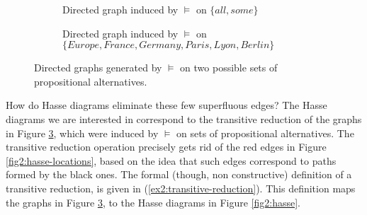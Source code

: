 \begin{figure}[H]
	\centering
	\begin{subfigure}[t]{.45\linewidth}
		\centering
		\caption{Directed graph induced by $\vDash$ on $\lbrace \textit{all}, \textit{some} \rbrace$}\label{fig2:entailment-graph-scalar}
	\end{subfigure}	
	\hfill
	\begin{subfigure}[t]{.45\linewidth}
		\centering
		\caption{Directed graph induced by $\vDash$ on $\lbrace \textit{Europe}, \textit{France}, \textit{Germany}, \textit{Paris}, \textit{Lyon}, \textit{Berlin} \rbrace$}\label{fig2:entailment-graph-locations}
	\end{subfigure}
	\caption{Directed graphs generated by $\vDash$ on two possible sets of propositional alternatives.}\label{ex2:graph-entailment}
\end{figure}

How do Hasse diagrams eliminate these few superfluous edges? The Hasse diagrams we are interested in correspond to the transitive reduction of the graphs in Figure \ref{ex2:graph-entailment}, which were induced by $\vDash$ on sets of propositional alternatives. The transitive reduction operation precisely gets rid of the red edges in Figure \ref{fig2:hasse-locations}, based on the idea that such edges correspond to paths formed by the black ones. The formal (though, non constructive) definition of a transitive reduction, is given in (\ref{ex2:transitive-reduction}). This definition maps the graphs in Figure \ref{ex2:graph-entailment}, to the Hasse diagrams in Figure \ref{fig2:hasse}.

\begin{exe}
	\label{ex2:transitive-reduction}
\end{exe}

